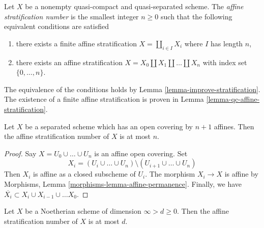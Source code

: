 \begin{definition}
\label{definition-affine-stratification-number}
Let $X$ be a nonempty quasi-compact and quasi-separated scheme. The
{\it affine stratification number} is the smallest integer $n \geq 0$
such that the following equivalent conditions are satisfied
\begin{enumerate}
\item there exists a finite affine stratification
$X = \coprod_{i \in I} X_i$ where $I$ has length $n$,
\item there exists an affine stratification
$X = X_0 \amalg X_1 \amalg \ldots \amalg X_n$ with
index set $\{0, \ldots, n\}$.
\end{enumerate}
\end{definition}

\noindent
The equivalence of the conditions holds by
Lemma \ref{lemma-improve-stratification}.
The existence of a finite affine stratification
is proven in Lemma \ref{lemma-qc-affine-stratification}.

\begin{lemma}
\label{lemma-affine-stratification-number-bound}
Let $X$ be a separated scheme which has an open covering by
$n + 1$ affines. Then the affine stratification number of $X$
is at most $n$.
\end{lemma}

\begin{proof}
Say $X = U_0 \cup \ldots \cup U_n$ is an affine open covering.
Set
$$
X_i = (U_i \cup \ldots \cup U_n) \setminus
(U_{i + 1} \cup \ldots \cup U_n)
$$
Then $X_i$ is affine as a closed subscheme of $U_i$. The morphism $X_i \to X$
is affine by Morphisms, Lemma \ref{morphisms-lemma-affine-permanence}.
Finally, we have $\overline{X_i} \subset X_i \cup X_{i - 1} \cup \ldots X_0$.
\end{proof}

\begin{lemma}
\label{lemma-affine-stratification-number-bound-Noetherian}
Let $X$ be a Noetherian scheme of dimension $\infty > d \geq 0$.
Then the affine stratification number of $X$ is at most $d$.
\end{lemma}

